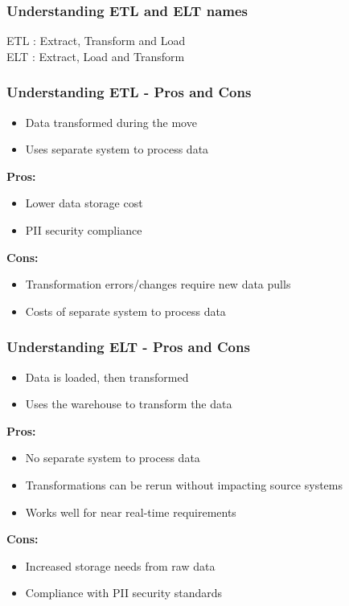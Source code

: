 \subsubsection{Understanding ETL and ELT names}
ETL : Extract, Transform and Load \\
ELT : Extract, Load and Transform

\subsubsection{Understanding ETL - Pros and Cons}
\begin{itemize}
    \item Data transformed during the move
    \item Uses separate system to process data
\end{itemize}

\textbf{Pros:}
\begin{itemize}
    \item Lower data storage cost
    \item PII security compliance
\end{itemize}

\textbf{Cons:}
\begin{itemize}
    \item Transformation errors/changes require new data pulls
    \item Costs of separate system to process data
\end{itemize}

\subsubsection{Understanding ELT - Pros and Cons}
\begin{itemize}
    \item Data is loaded, then transformed
    \item Uses the warehouse to transform the data
\end{itemize}

\textbf{Pros:}
\begin{itemize}
    \item No separate system to process data
    \item Transformations can be rerun without impacting source systems
    \item Works well for near real-time requirements
\end{itemize}

\textbf{Cons:}
\begin{itemize}
    \item Increased storage needs from raw data
    \item Compliance with PII security standards
\end{itemize}

